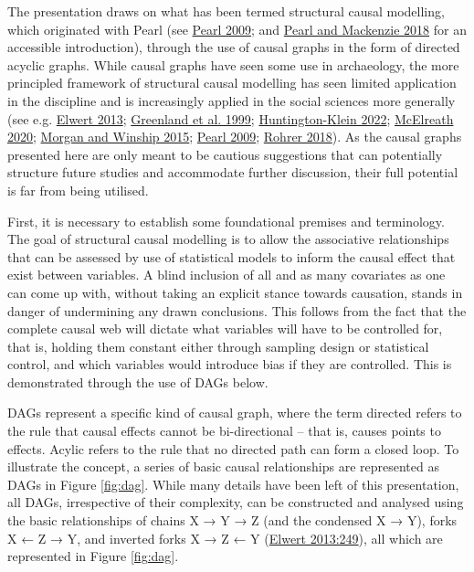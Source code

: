\documentclass[
  12pt,
  a4paper,
  oneside]{book}
\begin{document}
The presentation draws on what has been termed structural causal modelling, which originated with Pearl (see \protect\hyperlink{ref-pearl2009}{Pearl 2009}; and \protect\hyperlink{ref-pearl2018}{Pearl and Mackenzie 2018} for an accessible introduction), through the use of causal graphs in the form of directed acyclic graphs. While causal graphs have seen some use in archaeology, the more principled framework of structural causal modelling has seen limited application in the discipline and is increasingly applied in the social sciences more generally (see e.g. \protect\hyperlink{ref-elwert2013}{Elwert 2013}; \protect\hyperlink{ref-greenland1999}{Greenland et al. 1999}; \protect\hyperlink{ref-huntington-klein2022}{Huntington-Klein 2022}; \protect\hyperlink{ref-mcelreath2020}{McElreath 2020}; \protect\hyperlink{ref-morgan2015}{Morgan and Winship 2015}; \protect\hyperlink{ref-pearl2009}{Pearl 2009}; \protect\hyperlink{ref-rohrer2018}{Rohrer 2018}). As the causal graphs presented here are only meant to be cautious suggestions that can potentially structure future studies and accommodate further discussion, their full potential is far from being utilised.

First, it is necessary to establish some foundational premises and terminology. The goal of structural causal modelling is to allow the associative relationships that can be assessed by use of statistical models to inform the causal effect that exist between variables. A blind inclusion of all and as many covariates as one can come up with, without taking an explicit stance towards causation, stands in danger of undermining any drawn conclusions. This follows from the fact that the complete causal web will dictate what variables will have to be controlled for, that is, holding them constant either through sampling design or statistical control, and which variables would introduce bias if they are controlled. This is demonstrated through the use of DAGs below.

DAGs represent a specific kind of causal graph, where the term \textquotesingle directed\textquotesingle{} refers to the rule that causal effects cannot be bi-directional -- that is, causes points to effects. \textquotesingle Acylic\textquotesingle{} refers to the rule that no directed path can form a closed loop. To illustrate the concept, a series of basic causal relationships are represented as DAGs in Figure \ref{fig:dag}. While many details have been left of this presentation, all DAGs, irrespective of their complexity, can be constructed and analysed using the basic relationships of chains X → Y → Z (and the condensed X → Y), forks X ← Z → Y, and inverted forks X → Z ← Y (\protect\hyperlink{ref-elwert2013}{Elwert 2013:249}), all which are represented in Figure \ref{fig:dag}.
\end{document}

